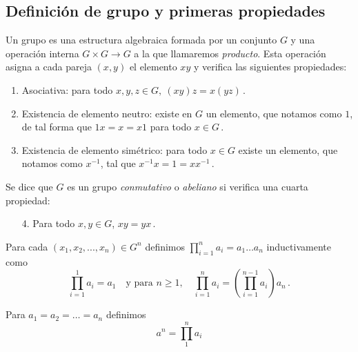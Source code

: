 \subsection{Definición de grupo y primeras propiedades}

\begin{ndef}[Grupo]
Un grupo es una estructura algebraica formada por un conjunto $G$ y una operación interna 
$G \times G \to G$ a la que llamaremos \textit{producto}. Esta operación asigna a cada pareja $(x,y)$ el elemento $xy$ y verifica las siguientes propiedades:
\begin{enumerate}
  \item Asociativa: para todo $x,y,z \in G, \ (xy)z = x(yz)\,.$
  \item Existencia de elemento neutro: existe en $G$ un elemento, que notamos como $1$, de tal forma que  $1x = x = x1$ para todo $x \in G$\,.
  \item Existencia de elemento simétrico: para todo $x \in G$ existe un elemento, que notamos como $x^{-1}$, tal que $x^{-1}x = 1 = xx^{-1}$\,.
\end{enumerate}
Se dice que $G$ es un grupo \textit{conmutativo} o \textit{abeliano} si verifica una cuarta propiedad: \begin{enumerate}
  \item[4.] Para todo $x, y \in G$, $xy = yx$\,.
\end{enumerate}

\end{ndef}

\begin{nota}[Notación]
  Para cada $(x_1,x_2,...,x_n) \in G^{n}$ definimos $\prod_{i=1}^{n} a_i = a_1\hdots a_n$ inductivamente como \begin{equation*}
    \prod_{i=1}^{1} a_i = a_1 \quad \text{y para } n \geq 1, \quad \prod_{i=1}^{n} a_i = \left(\prod_{i=1}^{n-1} a_i\right)a_n\,.
  \end{equation*}
\end{nota}

\begin{nota}[Notación]
  Para $a_1 = a_2 = \hdots = a_n$ definimos \begin{equation*}
    a^n = \prod_{1}^{n} a_i
  \end{equation*}
\end{nota}

